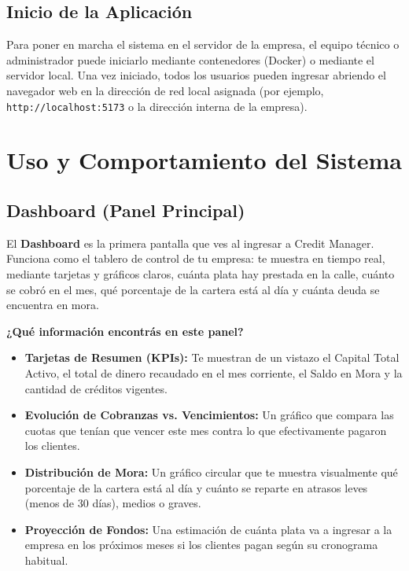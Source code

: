 \documentclass[12pt,a4paper]{article}
\renewcommand{\_}{\textunderscore\allowbreak}
\begin{document}
\subsection{Inicio de la Aplicación}
Para poner en marcha el sistema en el servidor de la empresa, el equipo técnico o administrador puede iniciarlo mediante contenedores (Docker) o mediante el servidor local. Una vez iniciado, todos los usuarios pueden ingresar abriendo el navegador web en la dirección de red local asignada (por ejemplo, \texttt{http://localhost:5173} o la dirección interna de la empresa).
\newpage

\section{Uso y Comportamiento del Sistema}

\subsection{Dashboard (Panel Principal)}
El \textbf{Dashboard} es la primera pantalla que ves al ingresar a Credit Manager. Funciona como el tablero de control de tu empresa: te muestra en tiempo real, mediante tarjetas y gráficos claros, cuánta plata hay prestada en la calle, cuánto se cobró en el mes, qué porcentaje de la cartera está al día y cuánta deuda se encuentra en mora.

\textbf{¿Qué información encontrás en este panel?}
\begin{itemize}
    \item \textbf{Tarjetas de Resumen (KPIs):} Te muestran de un vistazo el Capital Total Activo, el total de dinero recaudado en el mes corriente, el Saldo en Mora y la cantidad de créditos vigentes.
    \item \textbf{Evolución de Cobranzas vs. Vencimientos:} Un gráfico que compara las cuotas que tenían que vencer este mes contra lo que efectivamente pagaron los clientes.
    \item \textbf{Distribución de Mora:} Un gráfico circular que te muestra visualmente qué porcentaje de la cartera está al día y cuánto se reparte en atrasos leves (menos de 30 días), medios o graves.
    \item \textbf{Proyección de Fondos:} Una estimación de cuánta plata va a ingresar a la empresa en los próximos meses si los clientes pagan según su cronograma habitual.
\end{itemize}
\end{document}
